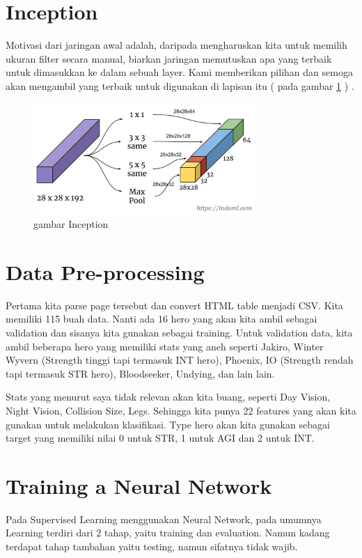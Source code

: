 \section{Inception}
Motivasi dari jaringan awal adalah, daripada mengharuskan kita untuk memilih ukuran filter secara manual, biarkan jaringan memutuskan apa yang terbaik untuk dimasukkan ke dalam sebuah layer. Kami memberikan pilihan dan semoga akan mengambil yang terbaik untuk digunakan di lapisan itu ( pada gambar \ref{Inception} ) .
\begin{figure}[!htp]
	\includegraphics[width=0.75\textwidth]{figures/inception.PNG}
	\caption{gambar Inception}
	\label{Inception}
\end{figure}

\section{Data Pre-processing}
Pertama kita parse page tersebut dan convert HTML table menjadi CSV. Kita memiliki 115 buah data. Nanti ada 16 hero yang akan kita ambil sebagai validation dan sisanya kita gunakan sebagai training. Untuk validation data, kita ambil beberapa hero yang memiliki stats yang aneh seperti Jakiro, Winter Wyvern (Strength tinggi tapi termasuk INT hero), Phoenix, IO (Strength rendah tapi termasuk STR hero), Bloodseeker, Undying, dan lain lain.

Stats yang menurut saya tidak relevan akan kita buang, seperti Day Vision, Night Vision, Collision Size, Legs. Sehingga kita punya 22 features yang akan kita gunakan untuk melakukan klasifikasi. Type hero akan kita gunakan sebagai target yang memiliki nilai 0 untuk STR, 1 untuk AGI dan 2 untuk INT.

\section{Training a Neural Network}
Pada Supervised Learning menggunakan Neural Network, pada umumnya Learning terdiri dari 2 tahap, yaitu training dan evaluation. Namun kadang terdapat tahap tambahan yaitu testing, namun sifatnya tidak wajib.

